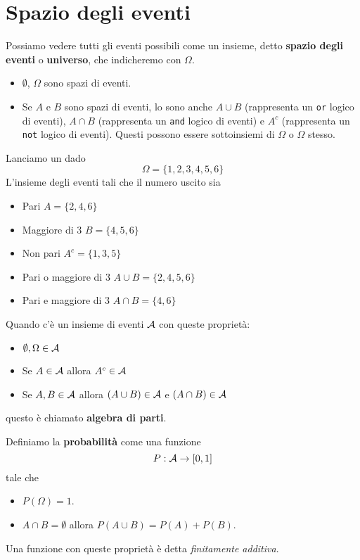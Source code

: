 \section{Spazio degli eventi}
Possiamo vedere tutti gli eventi possibili come un insieme, detto \textbf{spazio degli eventi} o
\textbf{universo}, che indicheremo con $\Omega$.
\begin{itemize}
	\item $\emptyset$, $\Omega$ sono spazi di eventi.
	\item Se $A$ e $B$ sono spazi di eventi, lo sono anche $A \cup B$ (rappresenta un \verb|or| logico di
	      eventi), $A \cap B$ (rappresenta un \verb|and| logico di eventi) e $A^c$ (rappresenta un
	      \verb|not| logico di eventi). Questi possono essere sottoinsiemi di $\Omega$ o $\Omega$ stesso.
\end{itemize}

\begin{example}
	Lanciamo un dado
	\[ \Omega = \{ 1, 2, 3, 4, 5, 6 \} \]
	L'insieme degli eventi tali che il numero uscito sia
	\begin{itemize}
		\item Pari $A = \{ 2, 4, 6 \}$
		\item Maggiore di 3 $B = \{ 4, 5, 6 \}$
		\item Non pari $A^c = \{ 1, 3, 5 \}$
		\item Pari o maggiore di 3 $A \cup B = \{ 2, 4, 5, 6 \}$
		\item Pari e maggiore di 3 $A \cap B = \{ 4, 6 \}$
	\end{itemize}
\end{example}

\begin{definition}
	Quando c'è un insieme di eventi $\mathcal{A}$ con queste proprietà:
	\begin{itemize}
		\item $\emptyset, \Omega \in \mathcal{A}$
		\item Se $A \in \mathcal{A}$ allora $A^c \in \mathcal{A}$
		\item Se $A, B \in \mathcal{A}$ allora $(A \cup B) \in \mathcal{A}$ e $(A \cap B) \in \mathcal{A}$
	\end{itemize}
	questo è chiamato \textbf{algebra di parti}.
\end{definition}

\begin{definition}[Provvisoria]
	Definiamo la \textbf{probabilità} come una funzione
	\[ P : \mathcal{A} \to [0, 1] \]
	tale che
	\begin{itemize}
		\item $P (\Omega) = 1$.
		\item $A \cap B = \emptyset$ allora $P(A \cup B) = P(A) + P(B)$.
	\end{itemize}
	Una funzione con queste proprietà è detta \emph{finitamente additiva}.
\end{definition}

